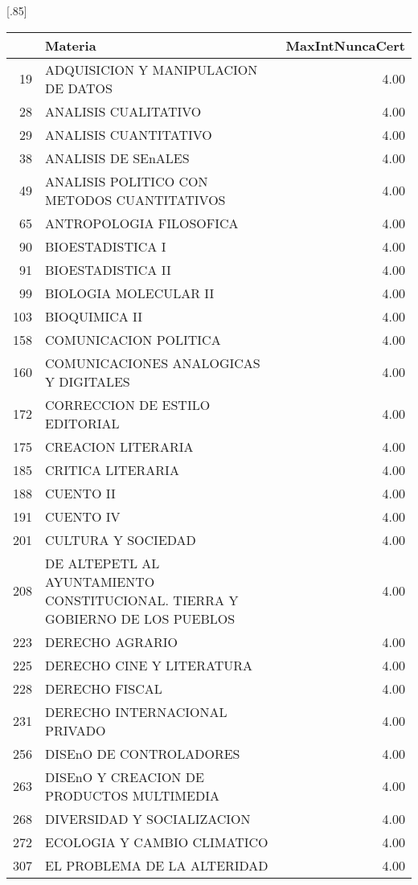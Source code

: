 \documentclass[12pt]{article}
\begin{document}
\begin{table}[ht]
\centering
\scalebox{0.75}[.85]{
\begin{tabular}{rlr}
  \hline
 & Materia & MaxIntNuncaCert \\ 
  \hline
 19 & ADQUISICION Y MANIPULACION DE DATOS & 4.00 \\ 
  28 & ANALISIS CUALITATIVO & 4.00 \\ 
  29 & ANALISIS CUANTITATIVO & 4.00 \\ 
  38 & ANALISIS DE SEnALES & 4.00 \\ 
  49 & ANALISIS POLITICO CON METODOS CUANTITATIVOS & 4.00 \\ 
  65 & ANTROPOLOGIA FILOSOFICA & 4.00 \\ 
  90 & BIOESTADISTICA I & 4.00 \\ 
  91 & BIOESTADISTICA II & 4.00 \\ 
  99 & BIOLOGIA MOLECULAR II & 4.00 \\ 
  103 & BIOQUIMICA II & 4.00 \\ 
  158 & COMUNICACION POLITICA & 4.00 \\ 
  160 & COMUNICACIONES ANALOGICAS Y DIGITALES & 4.00 \\ 
  172 & CORRECCION DE ESTILO EDITORIAL & 4.00 \\ 
  175 & CREACION LITERARIA & 4.00 \\ 
  185 & CRITICA LITERARIA & 4.00 \\ 
  188 & CUENTO II & 4.00 \\ 
  191 & CUENTO IV & 4.00 \\ 
  201 & CULTURA Y SOCIEDAD & 4.00 \\ 
  208 & DE ALTEPETL AL AYUNTAMIENTO CONSTITUCIONAL. TIERRA Y GOBIERNO DE LOS PUEBLOS & 4.00 \\ 
  223 & DERECHO AGRARIO & 4.00 \\ 
  225 & DERECHO CINE Y LITERATURA & 4.00 \\ 
  228 & DERECHO FISCAL & 4.00 \\ 
  231 & DERECHO INTERNACIONAL PRIVADO & 4.00 \\ 
  256 & DISEnO DE CONTROLADORES & 4.00 \\ 
  263 & DISEnO Y CREACION DE PRODUCTOS MULTIMEDIA & 4.00 \\ 
  268 & DIVERSIDAD Y SOCIALIZACION & 4.00 \\ 
  272 & ECOLOGIA Y CAMBIO CLIMATICO & 4.00 \\ 
  307 & EL PROBLEMA DE LA ALTERIDAD & 4.00 \\ 

\end{tabular}}
\end{table}
\end{document}
